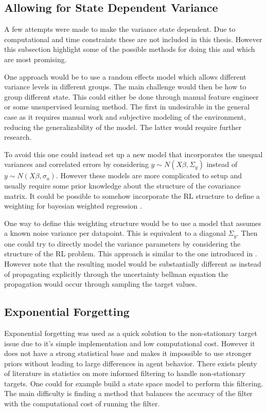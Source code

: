 \subsection{Allowing for State Dependent Variance}

A few attempts were made to make the variance state dependent. Due to computational and time constraints these are not included in this thesis. However this subsection highlight some of the possible methods for doing this and which are most promising.

One approach would be to use a random effects model \citep[p.~382-383]{gelman_2013} which allows different variance levels in different groups. The main challenge would then be how to group different state. This could either be done through manual feature engineer or some unsupervised learning method. The first in undesirable in the general case as it requires manual work and subjective modeling of the environment, reducing the generalizability of the model. The latter would require further research.

To avoid this one could instead set up a new model that incorporates the unequal variances and correlated errors by considering $y \sim N(X\beta, \Sigma_y)$ instead of $y \sim N(X\beta, \sigma_a)$.  However these models are more complicated to setup and usually require some prior knowledge about the structure of the covariance matrix. It could be possible to somehow incorporate the RL structure to define a weighting for bayesian weighted regression \citep[p.~370-373]{gelman_2013}. 

One way to define this weighting structure would be to use a model that assumes a known noise variance per datapoint. This is equivalent to a diagonal $\Sigma_y$. Then one could try to directly model the variance parameters by considering the structure of the RL problem. This approach is similar to the one introduced in \cite{donoghue_2017}. However note that the resulting model would be substantially different as instead of propagating explicitly through the uncertainty bellman equation the propagation would occur through sampling the target values.

\subsection{Exponential Forgetting}

Exponential forgetting was used as a quick solution to the non-stationary target issue due to it's simple implementation and low computational cost. However it does not have a strong statistical base and makes it impossible to use stronger priors without leading to large differences in agent behavior. There exists plenty of literature in statistics on more informed filtering to handle non-stationary targets. One could for example build a state space model to perform this filtering. The main difficulty is finding a method that balances the accuracy of the filter with the computational cost of running the filter.

